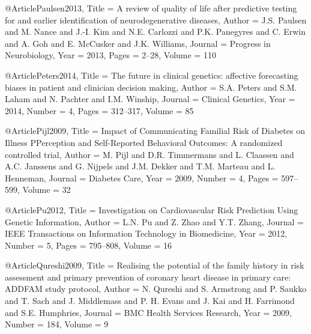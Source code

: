 @Article{Paulsen2013,
  Title                    = {A review of quality of life after predictive testing for and earlier identification of neurodegenerative diseases},
  Author                   = {J.S. Paulsen and M. Nance and J.-I. Kim and N.E. Carlozzi and P.K. Panegyres and C. Erwin and A. Goh and E. McCusker and J.K. Williams},
  Journal                  = {Progress in Neurobiology},
  Year                     = {2013},
  Pages                    = {2--28},
  Volume                   = {110}
}

@Article{Peters2014,
  Title                    = {The future in clinical genetics: affective forecasting biases in patient and clinician decision making},
  Author                   = {S.A. Peters and S.M. Laham and N. Pachter and I.M. Winship},
  Journal                  = {Clinical Genetics},
  Year                     = {2014},
  Number                   = {4},
  Pages                    = {312--317},
  Volume                   = {85}
}

@Article{Pijl2009,
  Title                    = {Impact of Communicating Familial Risk of Diabetes on Illness PPerception and Self-Reported Behavioral Outcomes: A randomized controlled trial},
  Author                   = {M. Pijl and D.R. Timmermans and L. Claassen and A.C. Janssens and G. Nijpels and J.M. Dekker and T.M. Marteau and L. Henneman},
  Journal                  = {Diabetes Care},
  Year                     = {2009},
  Number                   = {4},
  Pages                    = {597--599},
  Volume                   = {32}
}

@Article{Pu2012,
  Title                    = {Investigation on Cardiovascular Risk Prediction Using Genetic Information},
  Author                   = {L.N. Pu and Z. Zhao and Y.T. Zhang},
  Journal                  = {IEEE Transactions on Information Technology in Biomedicine},
  Year                     = {2012},
  Number                   = {5},
  Pages                    = {795--808},
  Volume                   = {16}
}

@Article{Qureshi2009,
  Title                    = {Realising the potential of the family history in risk assessment and primary prevention of coronary heart disease in primary care: ADDFAM study protocol},
  Author                   = {N. Qureshi and S. Armstrong and P. Saukko and T. Sach and J. Middlemass and P. H. Evans and J. Kai and H. Farrimond and S.E. Humphries},
  Journal                  = {BMC Health Services Research},
  Year                     = {2009},
  Number                   = {184},
  Volume                   = {9}
}


